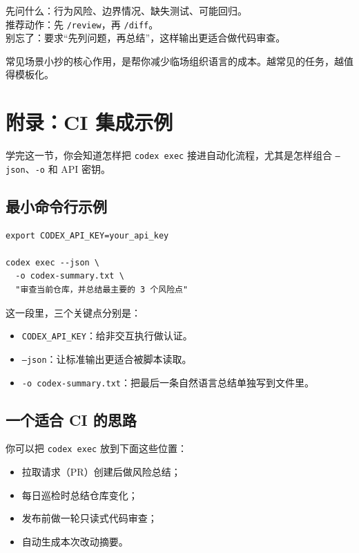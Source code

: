 \documentclass[UTF8,a4paper,12pt]{ctexart}
\begin{document}
\begin{tipbox}
先问什么：行为风险、边界情况、缺失测试、可能回归。\\
推荐动作：先 \texttt{/review}，再 \texttt{/diff}。\\
别忘了：要求“先列问题，再总结”，这样输出更适合做代码审查。
\end{tipbox}

\begin{sumbox}
常见场景小抄的核心作用，是帮你减少临场组织语言的成本。越常见的任务，越值得模板化。
\end{sumbox}

\section{附录：CI 集成示例}

\begin{learnbox}
学完这一节，你会知道怎样把 \texttt{codex exec} 接进自动化流程，尤其是怎样组合 \texttt{--json}、\texttt{-o} 和 API 密钥。
\end{learnbox}

\subsection{最小命令行示例}

\begin{lstlisting}[style=cli]
export CODEX_API_KEY=your_api_key

codex exec --json \
  -o codex-summary.txt \
  "审查当前仓库，并总结最主要的 3 个风险点"
\end{lstlisting}

这一段里，三个关键点分别是：
\begin{itemize}
  \item \texttt{CODEX\_API\_KEY}：给非交互执行做认证。
  \item \texttt{--json}：让标准输出更适合被脚本读取。
  \item \texttt{-o codex-summary.txt}：把最后一条自然语言总结单独写到文件里。
\end{itemize}

\subsection{一个适合 CI 的思路}

你可以把 \texttt{codex exec} 放到下面这些位置：
\begin{itemize}
  \item 拉取请求（PR）创建后做风险总结；
  \item 每日巡检时总结仓库变化；
  \item 发布前做一轮只读式代码审查；
  \item 自动生成本次改动摘要。
\end{itemize}
\end{document}
